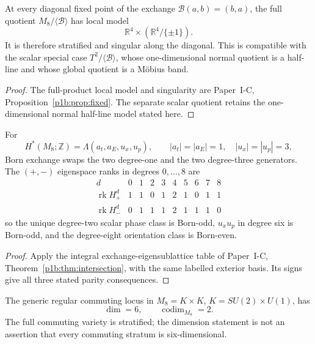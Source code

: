 \documentclass[11pt,a4paper]{article}
\begin{document}
\begin{proposition}
\label{p3b:prop:v193-full-born-quotient-singularity}
At every diagonal fixed point of the exchange
\(\mathcal B(a,b)=(b,a)\), the full quotient \(M_8/\langle\mathcal B\rangle\)
has local model
\[
 \boxed{\mathbb R^4\times(\mathbb R^4/\{\pm1\}).}
\]
It is therefore stratified and singular along the diagonal.  This is
compatible with the scalar special case
\(T^2/\langle\mathcal B\rangle\), whose one-dimensional normal quotient is a
half-line and whose global quotient is a M\"obius band.
\end{proposition}

\begin{proof}
The full-product local model and singularity are Paper~I-C,
Proposition~\ref{p1b:prop:fixed}.  The separate scalar quotient retains
the one-dimensional normal half-line model stated here.
\end{proof}

\begin{proposition}
\label{p3b:prop:v193-born-cohomology-eigenspaces}
For
\[
 H^*(M_8;\mathbb Z)=\Lambda(a_t,a_E,u_x,u_p),
 \qquad |a_t|=|a_E|=1,\quad |u_x|=|u_p|=3,
\]
Born exchange swaps the two degree-one and the two degree-three generators.
The \((+,-)\) eigenspace ranks in degrees \(0,\ldots,8\) are
\[
\boxed{
\begin{array}{c|ccccccccc}
 d&0&1&2&3&4&5&6&7&8\\ \hline
 \operatorname{rk}H^d_+&1&1&0&1&2&1&0&1&1\\
 \operatorname{rk}H^d_-&0&1&1&1&2&1&1&1&0
\end{array}}
\]
so the unique degree-two scalar phase class is Born-odd,
\(u_xu_p\) in degree six is Born-odd, and the degree-eight orientation class
is Born-even.
\end{proposition}

\begin{proof}
Apply the integral exchange-eigensublattice table of Paper~I-C,
Theorem~\ref{p1b:thm:intersection}, with the same labelled exterior
basis.  Its signs give all three stated parity consequences.
\end{proof}

\begin{proposition}
\label{p3b:prop:v193-generic-commuting-locus}
The generic regular commuting locus in
\(M_8=K\times K\), \(K=SU(2)\times U(1)\), has
\[
 \boxed{\dim=6,\qquad \operatorname{codim}_{M_8}=2.}
\]
The full commuting variety is stratified; the dimension statement is not an
assertion that every commuting stratum is six-dimensional.
\end{proposition}
\end{document}
